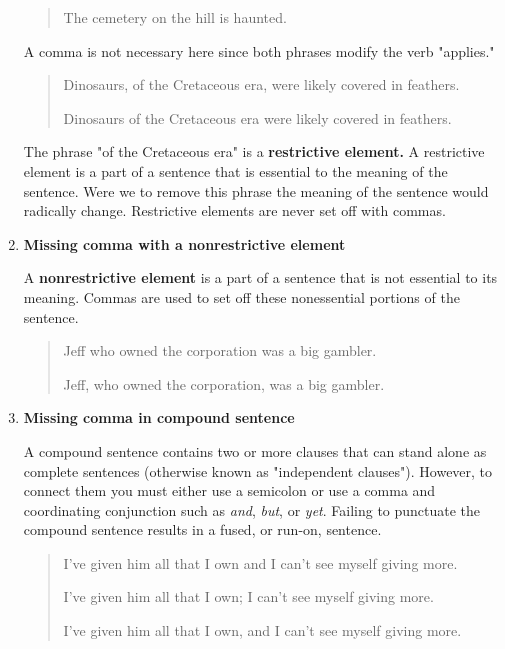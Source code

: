 \begin{enumerate}
\begin{quote}
The cemetery on the hill is haunted. 

\end{quote}

 A comma is not necessary here since both phrases 
modify the verb "applies." 

\begin{quote}
Dinosaurs, of the Cretaceous era, were likely covered in feathers.  

Dinosaurs of the Cretaceous era were likely covered in feathers.  

\end{quote}

 The phrase "of the Cretaceous era" is a \textbf{restrictive element.} 
A restrictive element is a part of a sentence that is essential to the meaning 
of the sentence. Were we to remove this phrase the meaning of the sentence would 
radically change. Restrictive elements are never set off with commas.

\item \textbf{Missing comma with a nonrestrictive element}

A \textbf{nonrestrictive element} is a part of a sentence that is not essential to its
meaning. Commas are used to set off these nonessential portions of the
sentence.

\begin{quote}
Jeff who owned the corporation was a big gambler. 

Jeff, who owned the corporation, was a big gambler. 
\end{quote}

\item \textbf{Missing comma in compound sentence}

A compound sentence contains two or more clauses that can stand alone as
complete sentences (otherwise known as "independent clauses"). However,
to connect them you must either use a semicolon or use a comma and
coordinating conjunction such as \emph{and}, \emph{but}, or \emph{yet}. Failing
to punctuate the compound sentence results in a fused, or run-on, sentence.

\begin{quote}
I've given him all that I own and I can't see myself giving more. 

I've given him all that I own; I can't see myself giving more.  

I've given him all that I own, and I can't see myself giving more. 


\end{quote}
\end{enumerate}
